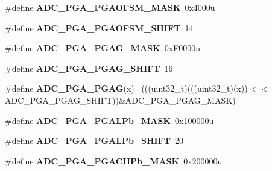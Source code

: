 \begin{DoxyCompactItemize}
\item 
\hypertarget{group___a_d_c___register___masks_ga5cd99ceaadccd4c53699d50145bc5241}{}\#define {\bfseries A\+D\+C\+\_\+\+P\+G\+A\+\_\+\+P\+G\+A\+O\+F\+S\+M\+\_\+\+M\+A\+S\+K}~0x4000u\label{group___a_d_c___register___masks_ga5cd99ceaadccd4c53699d50145bc5241}

\item 
\hypertarget{group___a_d_c___register___masks_ga8521b31620f362ec270dcccf40e1819b}{}\#define {\bfseries A\+D\+C\+\_\+\+P\+G\+A\+\_\+\+P\+G\+A\+O\+F\+S\+M\+\_\+\+S\+H\+I\+F\+T}~14\label{group___a_d_c___register___masks_ga8521b31620f362ec270dcccf40e1819b}

\item 
\hypertarget{group___a_d_c___register___masks_ga55a340c6fac33dc33fa72db68c8a6576}{}\#define {\bfseries A\+D\+C\+\_\+\+P\+G\+A\+\_\+\+P\+G\+A\+G\+\_\+\+M\+A\+S\+K}~0x\+F0000u\label{group___a_d_c___register___masks_ga55a340c6fac33dc33fa72db68c8a6576}

\item 
\hypertarget{group___a_d_c___register___masks_gaa0979a2ccd896d245b77f053076cf2c6}{}\#define {\bfseries A\+D\+C\+\_\+\+P\+G\+A\+\_\+\+P\+G\+A\+G\+\_\+\+S\+H\+I\+F\+T}~16\label{group___a_d_c___register___masks_gaa0979a2ccd896d245b77f053076cf2c6}

\item 
\hypertarget{group___a_d_c___register___masks_ga1d4942de079b809f824f89c6b3ac2be1}{}\#define {\bfseries A\+D\+C\+\_\+\+P\+G\+A\+\_\+\+P\+G\+A\+G}(x)                                                ~(((uint32\+\_\+t)(((uint32\+\_\+t)(x))$<$$<$A\+D\+C\+\_\+\+P\+G\+A\+\_\+\+P\+G\+A\+G\+\_\+\+S\+H\+I\+F\+T))\&A\+D\+C\+\_\+\+P\+G\+A\+\_\+\+P\+G\+A\+G\+\_\+\+M\+A\+S\+K)\label{group___a_d_c___register___masks_ga1d4942de079b809f824f89c6b3ac2be1}

\item 
\hypertarget{group___a_d_c___register___masks_ga55e2d804ae75c3df8afb47b7fefe098f}{}\#define {\bfseries A\+D\+C\+\_\+\+P\+G\+A\+\_\+\+P\+G\+A\+L\+Pb\+\_\+\+M\+A\+S\+K}~0x100000u\label{group___a_d_c___register___masks_ga55e2d804ae75c3df8afb47b7fefe098f}

\item 
\hypertarget{group___a_d_c___register___masks_ga6d9631a2ca93115d33735cff2b17ebef}{}\#define {\bfseries A\+D\+C\+\_\+\+P\+G\+A\+\_\+\+P\+G\+A\+L\+Pb\+\_\+\+S\+H\+I\+F\+T}~20\label{group___a_d_c___register___masks_ga6d9631a2ca93115d33735cff2b17ebef}

\item 
\hypertarget{group___a_d_c___register___masks_gaf25d1b1ea2c8630ec960f311ecf4cb35}{}\#define {\bfseries A\+D\+C\+\_\+\+P\+G\+A\+\_\+\+P\+G\+A\+C\+H\+Pb\+\_\+\+M\+A\+S\+K}~0x200000u\label{group___a_d_c___register___masks_gaf25d1b1ea2c8630ec960f311ecf4cb35}


\end{DoxyCompactItemize}
